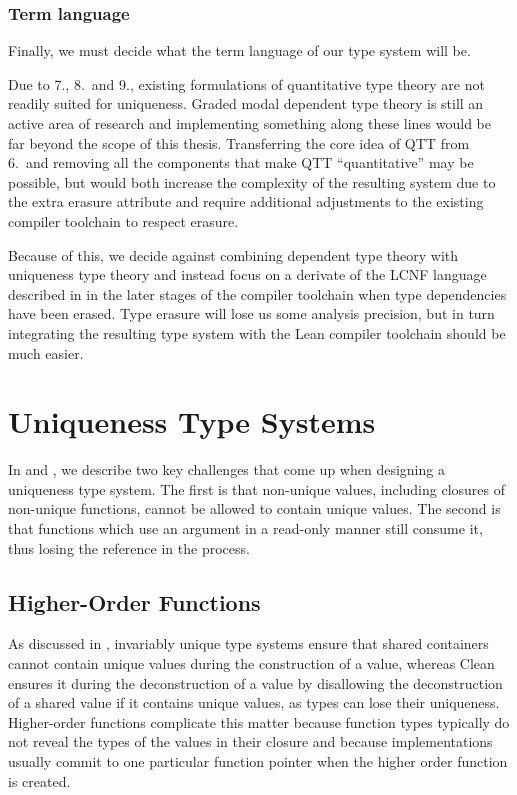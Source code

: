\subsubsection{Term language}
Finally, we must decide what the term language of our type system will be. 

Due to 7., 8.\ and 9., existing formulations of quantitative type theory are not readily suited for uniqueness. Graded modal dependent type theory \citep{moon_graded_2021} is still an active area of research and implementing something along these lines would be far beyond the scope of this thesis. Transferring the core idea of QTT from 6.\ and removing all the components that make QTT ``quantitative'' may be possible, but would both increase the complexity of the resulting system due to the extra erasure attribute and require additional adjustments to the existing compiler toolchain to respect erasure. 

Because of this, we decide against combining dependent type theory with uniqueness type theory and instead focus on a derivate of the LCNF language described in  in the later stages of the compiler toolchain when type dependencies have been erased. Type erasure will lose us some analysis precision, but in turn integrating the resulting type system with the Lean compiler toolchain should be much easier.

\section{Uniqueness Type Systems}
In  and , we describe two key challenges that come up when designing a uniqueness type system. The first is that non-unique values, including closures of non-unique functions, cannot be allowed to contain unique values. The second is that functions which use an argument in a read-only manner still consume it, thus losing the reference in the process.

\subsection{Higher-Order Functions}\label{sec:hof}
As discussed in , invariably unique type systems ensure that shared containers cannot contain unique values during the construction of a value, whereas Clean ensures it during the deconstruction of a value by disallowing the deconstruction of a shared value if it contains unique values, as types can lose their uniqueness. Higher-order functions complicate this matter because function types typically do not reveal the types of the values in their closure and because implementations usually commit to one particular function pointer when the higher order function is created. 

